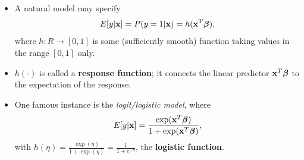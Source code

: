 \documentclass{beamer}
\newcommand{\boldbeta}{{\boldsymbol \beta}}
\newcommand{\boldx}{{\bf x}}
\newenvironment{wideitemize}%
  {\begin{itemize}%
    \setlength{\parskip}{1em}}%
  {\end{itemize}}
\begin{document}
\begin{frame}

\begin{wideitemize}
\item  A natural model may specify
\[
E[y|\boldx] = P(y = 1| {\bf x}) = h(\boldx^T\boldbeta),
\] where $h : R \rightarrow [0, 1]$ is some (sufficiently smooth) function taking values in the range $[0, 1]$ only. 

 \item  $h(\cdot) $ is called a  {\bf response function}; it connects the linear predictor $\boldx^T\boldbeta$ to the expectation of the response. 
 
 \item One famous instance is the \emph{logit/logistic model}, where
 \[
 E[y|\boldx] = \frac{\exp(\boldx^T \boldbeta)}{1 + \exp(\boldx^T \boldbeta)},
 \]
with $h(\eta)  = \frac{\exp(\eta)}{1 + \exp(\eta)} =  \frac{1}{1 + e^{-\eta}}$, the {\bf logistic  function}.
 

\end{wideitemize}
\end{frame}
\end{document}
